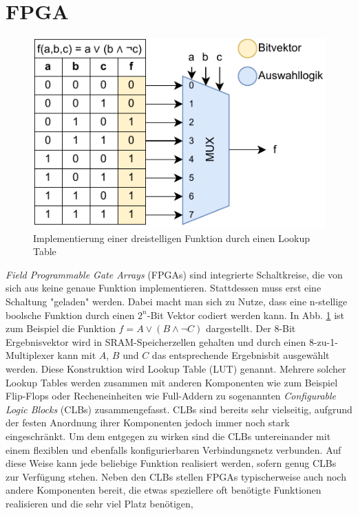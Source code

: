 \section{FPGA}
\label{sec:fpga}
\begin{figure}
    \center
    \includegraphics{images/LUT.pdf}
    \caption{Implementierung einer dreistelligen Funktion durch einen Lookup Table}
    \label{fig:fpga_lut}
\end{figure}
\textit{Field Programmable Gate Arrays} (FPGAs) sind integrierte Schaltkreise, die von sich aus keine genaue Funktion implementieren.
Stattdessen muss erst eine Schaltung "geladen" werden. Dabei macht man sich zu Nutze, dass eine n-stellige boolsche Funktion
durch einen $2^n$-Bit Vektor codiert werden kann. In Abb. \ref{fig:fpga_lut} ist zum Beispiel die Funktion
$f = A \vee (B \wedge \neg C)$ dargestellt. Der 8-Bit Ergebnisvektor wird in SRAM-Speicherzellen gehalten und durch einen 8-zu-1-Multiplexer
kann mit $A$, $B$ und $C$ das entsprechende Ergebnisbit ausgewählt werden. Diese Konstruktion wird Lookup Table (LUT) genannt.
Mehrere solcher Lookup Tables werden zusammen mit anderen Komponenten wie zum Beispiel Flip-Flops oder Recheneinheiten
wie Full-Addern zu sogenannten \textit{Configurable Logic Blocks} (CLBs) zusammengefasst. CLBs sind bereits sehr vielseitig,
aufgrund der festen Anordnung ihrer Komponenten jedoch immer noch stark eingeschränkt. Um dem entgegen zu wirken sind die CLBs
untereinander mit einem flexiblen und ebenfalls konfigurierbaren Verbindungsnetz verbunden. Auf diese Weise kann jede beliebige
Funktion realisiert werden, sofern genug CLBs zur Verfügung stehen. Neben den CLBs stellen FPGAs typischerweise auch noch andere
Komponenten bereit, die etwas speziellere oft benötigte Funktionen realisieren und die sehr viel Platz benötigen,
